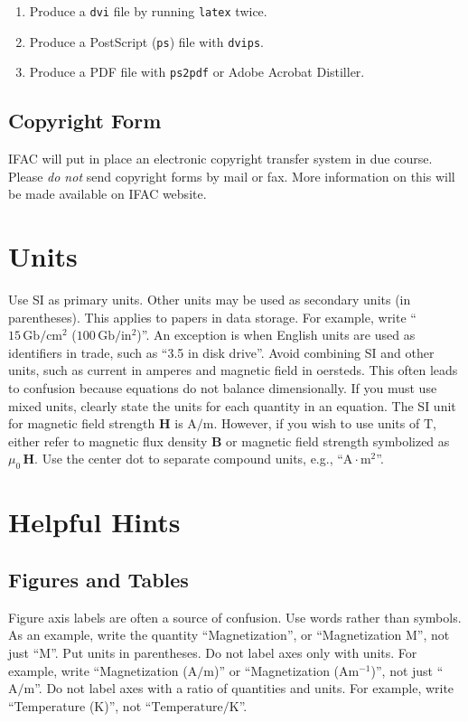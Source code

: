 \documentclass{ifacconf}
\begin{document}
\begin{enumerate}
  \item Produce a \texttt{dvi} file by running \texttt{latex} twice.
  \item Produce a PostScript (\texttt{ps}) file with \texttt{dvips}.
  \item Produce a PDF file with \texttt{ps2pdf} or Adobe Acrobat
  Distiller.
\end{enumerate}

\subsection{Copyright Form}

IFAC will put in place an electronic copyright transfer system in due
course. Please \emph{do not} send copyright forms by mail or fax. More
information on this will be made available on IFAC website.


\section{Units}

Use SI as primary units. Other units may be used as secondary units
(in parentheses). This applies to papers in data storage. For example,
write ``$15\,\mathrm{Gb}/\mathrm{cm}^2$ ($100\,\mathrm{Gb}/\mathrm{in}^2$)''. 
An exception is when
English units are used as identifiers in trade, such as ``3.5 in
disk drive''. Avoid combining SI and other units, such as current in
amperes and magnetic field in oersteds. This often leads to confusion
because equations do not balance dimensionally. If you must use mixed
units, clearly state the units for each quantity in an equation.  The
SI unit for magnetic field strength $\mathbf{H}$ is $\mathrm{A}/\mathrm{m}$. However, if you wish to
use units of $\mathrm{T}$, either refer to magnetic flux density $\mathbf{B}$ or
magnetic field strength symbolized as $\mu_0\,\mathbf{H}$. Use the center dot to
separate compound units, e.g., ``$\mathrm{A} \cdot \mathrm{m}^2$''.

\section{Helpful Hints}

\subsection{Figures and Tables}

Figure axis labels are often a source of confusion. Use words rather
than symbols. As an example, write the quantity ``Magnetization'', or
``Magnetization M'', not just ``M''. Put units in parentheses. Do not
label axes only with units.  For example, write ``Magnetization
($\mathrm{A}/\mathrm{m}$)'' or ``Magnetization ($\mathrm{A} \mathrm{m}^{-1}$)'', not just
 ``$\mathrm{A}/\mathrm{m}$''. Do not
label axes with a ratio of quantities and units. For example, write
``Temperature ($\mathrm{K}$)'', not ``$\mbox{Temperature}/\mathrm{K}$''.
\end{document}
